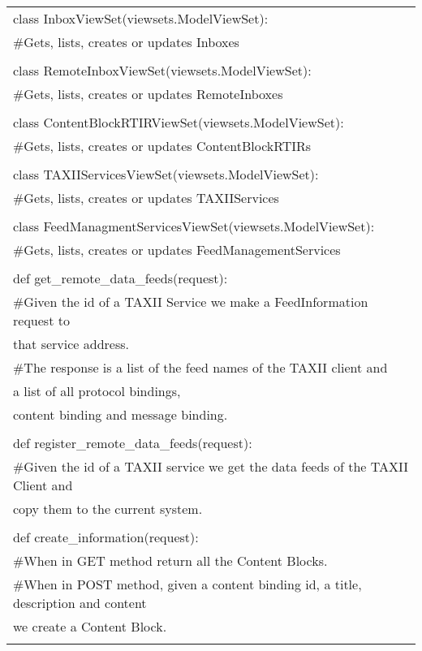 	\begin{center}
		\begin{longtable}{|l|}
			\hline
			
			class InboxViewSet(viewsets.ModelViewSet):\\
			\#Gets, lists, creates or updates Inboxes\\ \\
			
			class RemoteInboxViewSet(viewsets.ModelViewSet):\\
			\#Gets, lists, creates or updates RemoteInboxes\\ \\
			
			class ContentBlockRTIRViewSet(viewsets.ModelViewSet):\\
			\#Gets, lists, creates or updates ContentBlockRTIRs\\ \\
			
			class TAXIIServicesViewSet(viewsets.ModelViewSet):\\
			\#Gets, lists, creates or updates TAXIIServices\\ \\
			
			class FeedManagmentServicesViewSet(viewsets.ModelViewSet):\\
			\#Gets, lists, creates or updates FeedManagementServices\\ \\
			
			
			def get\_remote\_data\_feeds(request):\\
			\#Given the id of a TAXII Service we make a FeedInformation request to\\ that service address.\\
			\#The response is a list of the feed names of the TAXII client and\\ a list of all protocol bindings,\\ content binding and message binding.\\ \\
			
			def register\_remote\_data\_feeds(request):\\
			\#Given the id of a TAXII service we get the data feeds of the TAXII Client and\\ copy them to the current system.\\ \\
			
			def create\_information(request):\\
			\#When in GET method return all the Content Blocks.\\
			\#When in POST method, given a content binding id, a title, description and content\\ we create a Content Block.\\ \\
			

\end{longtable}
\end{center}
